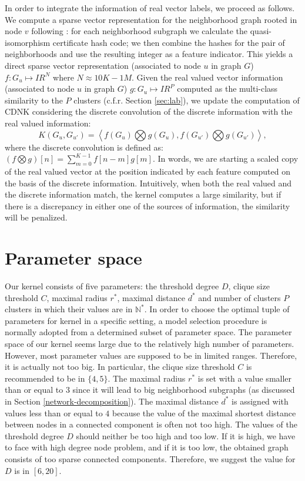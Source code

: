 \documentclass[review]{elsarticle}
\begin{document}
In order to integrate the information of real vector labels, we proceed as follows. We compute a sparse vector representation for the neighborhood graph rooted in node $v$ following \cite{costa2010fast}: for each neighborhood subgraph we calculate the quasi-isomorphism certificate hash code; we then combine the hashes for the pair of neighborhoods and use the resulting integer as a feature indicator. This yields a direct sparse vector representation (associated to node $u$ in graph $G$) $f: G_u \longmapsto I\!R^N$ where $N \approx 10K-1M$. Given the real valued vector information (associated to node $u$ in graph $G$) $g: G_u \longmapsto I\!R^P$ computed as the multi-class similarity to the $P$ clusters (c.f.r. Section \ref{sec:lab}), we update the computation of CDNK considering the discrete convolution of the discrete information with the real valued information:   
\begin{equation}
K(G_u,G_{u'}) = \left< f(G_u) \bigotimes g(G_u), f(G_{u'}) \bigotimes g(G_{u'}) \right>,
\end{equation}
where the discrete convolution is defined as: 
$(f \bigotimes g)[n]=\sum _{m=0}^{K-1}f[n-m]g[m].$
In words, we are starting a scaled copy of the real valued vector at the position indicated by each feature computed on the basis of the discrete information. Intuitively, when both the real valued and the discrete information match, the kernel computes a large similarity, but if there is a discrepancy in either one of the sources of information, the similarity will be penalized. 

\section{Parameter space}
Our kernel consists of five parameters: the threshold degree $D$, clique size threshold $C$, maximal radius $r^*$, maximal distance $d^*$ and number of clusters $P$ clusters in which their values are in $\mathbb{N}^*$. In order to choose the optimal tuple of parameters for kernel in a specific setting, a model selection procedure is normally adopted from a determined subset of parameter space. The parameter space of our kernel seems large due to the relatively high number of parameters. However, most parameter values are supposed to be in limited ranges. Therefore, it is actually not too big. In particular, the clique size threshold $C$ is recommended to be in $\lbrace 4, 5\rbrace$. The maximal radius $r^*$ is set with a value smaller than or equal to $3$ since it will lead to big neighborhood subgraphs (as discussed in Section \ref{network-decomposition}). The maximal distance $d^*$ is assigned with values less than or equal to $4$ because the value of the maximal shortest distance between nodes in a connected component is often not too high. The values of the threshold degree $D$ should neither be too high and too low. If it is high, we have to face with high degree node problem, and if it is too low, the obtained graph consists of too sparse connected components. Therefore, we suggest the value for $D$ is in $\left[6, 20 \right]$. 
\end{document}
